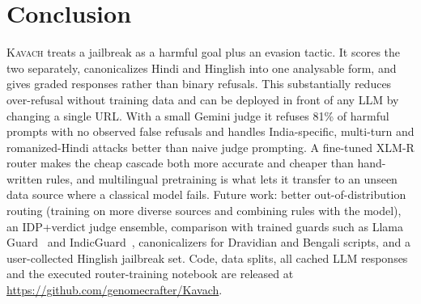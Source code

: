 \documentclass[conference]{IEEEtran}
\begin{document}
\section{Conclusion}
\textsc{Kavach} treats a jailbreak as a harmful goal plus an evasion tactic. It scores the two separately, canonicalizes Hindi and Hinglish into one analysable form, and gives graded responses rather than binary refusals. This substantially reduces over-refusal without training data and can be deployed in front of any LLM by changing a single URL. With a small Gemini judge it refuses 81\% of harmful prompts with no observed false refusals and handles India-specific, multi-turn and romanized-Hindi attacks better than naive judge prompting. A fine-tuned XLM-R router makes the cheap cascade both more accurate and cheaper than hand-written rules, and multilingual pretraining is what lets it transfer to an unseen data source where a classical model fails. Future work: better out-of-distribution routing (training on more diverse sources and combining rules with the model), an IDP+verdict judge ensemble, comparison with trained guards such as Llama Guard~\cite{inan2023llamaguard} and IndicGuard~\cite{bramhecha2026indicguard}, canonicalizers for Dravidian and Bengali scripts, and a user-collected Hinglish jailbreak set. Code, data splits, all cached LLM responses and the executed router-training notebook are released at \url{https://github.com/genomecrafter/Kavach}.



\end{document}
